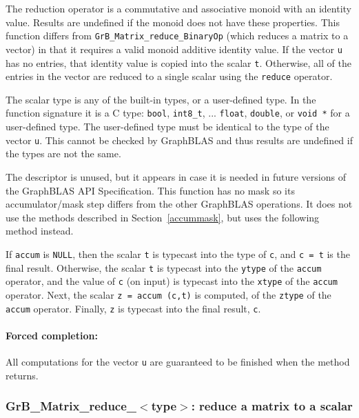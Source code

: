 \documentclass[12pt]{article}
\begin{document}
The reduction operator is a commutative and associative monoid with an identity
value.  Results are undefined if the monoid does not have these properties.
This function differs from \verb'GrB_Matrix_reduce_BinaryOp' (which reduces
a matrix to a vector) in that it requires a
valid monoid additive identity value.  If the vector \verb'u' has no entries,
that identity value is copied into the scalar \verb't'.  Otherwise, all of the
entries in the vector are reduced to a single scalar using the \verb'reduce'
operator.

The scalar type is any of the built-in types, or a user-defined type.  In the
function signature it is a C type: \verb'bool', \verb'int8_t', ...
\verb'float', \verb'double', or \verb'void *' for a user-defined type.
The user-defined type must be identical to the type of the vector \verb'u'.
This cannot be checked by GraphBLAS and thus results are undefined if the
types are not the same.

The descriptor is unused, but it appears in case it is needed in future
versions of the GraphBLAS API Specification. 
This function has no mask so its accumulator/mask step differs from the other
GraphBLAS operations.  It does not use the methods described in
Section~\ref{accummask}, but uses the following method instead.

If \verb'accum' is \verb'NULL', then the scalar \verb't' is typecast into the
type of \verb'c', and \verb'c = t' is the final result.  Otherwise, the scalar
\verb't' is typecast into the \verb'ytype' of the \verb'accum' operator, and
the value of \verb'c' (on input) is typecast into the \verb'xtype' of the
\verb'accum' operator.  Next, the scalar \verb'z = accum (c,t)' is computed, of
the \verb'ztype' of the \verb'accum' operator.  Finally, \verb'z' is typecast
into the final result, \verb'c'.

\paragraph{Forced completion:}
All computations for the vector \verb'u' are
guaranteed to be finished when the method returns.

\newpage
\subsubsection{{\sf GrB\_Matrix\_reduce\_$<$type$>$:} reduce a matrix to a scalar}
\label{reduce_matrix_to_scalar}
\end{document}
